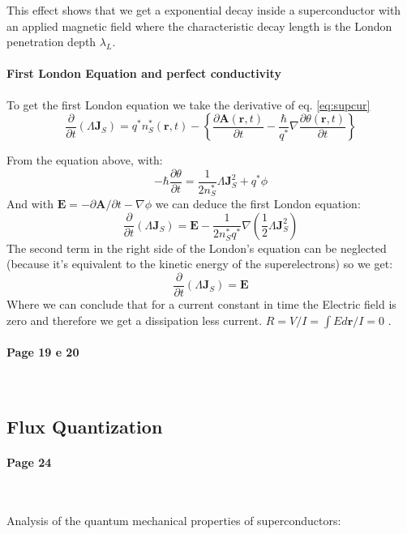 \documentclass[12pt]{article}
\numberwithin{equation}{subsection}
\newcommand\ask[1]{
{\color{red}
#1
}
}
\newcommand\page[1]{
{
\color{blue}\paragraph{
Page #1
}\mbox{}\\
}
}
\begin{document}
This effect shows that we get a exponential decay inside a superconductor with an applied magnetic field where the characteristic decay length is the London penetration depth $\lambda_L$.

\paragraph{First London Equation and perfect conductivity\\}
To get the first London equation we take the derivative of eq. \ref{eq:supcur}
\begin{equation}
    \frac{\partial}{\partial t}  (\Lambda \mathbf J_S) = q^* n_S^*(\mathbf r,t) -\left \{\frac{\partial \mathbf A (\mathbf r, t)}{\partial t} -\frac{\hbar}{q^*} \nabla\frac{\partial \theta(\mathbf r, t)}{\partial t}   \right \}
    \label{eq:supcur}
\end{equation}

From the equation above, with:
\begin{equation}
    -\hbar \frac{\partial \theta}{\partial t}  = \frac{1}{2n^*_S} \Lambda \mathbf J^2_S + q^*\phi
    \label{eq:energy_phase}
\end{equation}
And with $ \mathbf E = - \partial \mathbf A /\partial t - \nabla \phi$ we can deduce the first London equation:
\begin{equation}
     \frac{\partial}{\partial t}  (\Lambda \mathbf J_S) = \mathbf E - \frac{1}{2n^*_Sq^*} \nabla (\frac{1}{2}\Lambda \mathbf J_S^2)
\label{eq:fstld}
\end{equation}
The second term in the right side of the London's equation can be neglected (because it's equivalent to the kinetic energy of the superelectrons) so we get:
\begin{equation}
     \frac{\partial}{\partial t}  (\Lambda \mathbf J_S) = \mathbf E 
\label{eq:fstldneglected}
\end{equation}
Where we can conclude that for a current constant in time the Electric field is zero and therefore we get a dissipation less current. $R=V/I=\int E d\mathbf r/I =0$ .

\page{19 e 20}
\subsection{Flux Quantization}
\page{24}
Analysis of the quantum mechanical properties of superconductors:
\end{document}
